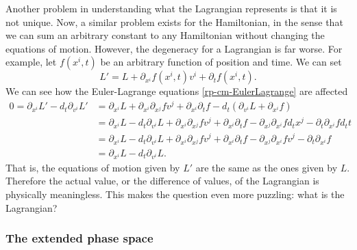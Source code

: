 Another problem in understanding what the Lagrangian represents is that it is not unique. Now, a similar problem exists for the Hamiltonian, in the sense that we can sum an arbitrary constant to any Hamiltonian without changing the equations of motion. However, the degeneracy for a Lagrangian is far worse. For example, let $f(x^i,t)$ be an arbitrary function of position and time. We can set
\begin{equation}\label{rp-cm-lm-gaugeChange}
	L' = L + \partial_{x^i} f(x^i, t) v^i + \partial_t f(x^i, t).
\end{equation}
We can see how the Euler-Lagrange equations \ref{rp-cm-EulerLagrange} are affected
\begin{equation}
	\begin{aligned}
		0 =\partial_{x^i}L' - d_t \partial_{v^i} L' &= \partial_{x^i} L + \partial_{x^i} \partial_{x^j} f v^j + \partial_{x^i} \partial_t f - d_t \left( \partial_{v^i} L + \partial_{x^i} f \right) \\
		&= \partial_{x^i} L - d_t \partial_{v^i} L + \partial_{x^i} \partial_{x^j} f v^j + \partial_{x^i} \partial_t f - \partial_{x^j}\partial_{x^i} f d_t x^j - \partial_t \partial_{x^i} f d_t t \\
		&= \partial_{x^i} L - d_t \partial_{v^i} L + \partial_{x^i} \partial_{x^j} f v^j + \partial_{x^i} \partial_t f - \partial_{x^j}\partial_{x^i} f v^j - \partial_t \partial_{x^i} f \\
		&= \partial_{x^i} L - d_t \partial_{v^i} L.
	\end{aligned}
\end{equation}
That is, the equations of motion given by $L'$ are the same as the ones given by $L$. Therefore the actual value, or the difference of values, of the Lagrangian is physically meaningless. This makes the question even more puzzling: what is the Lagrangian?

\subsubsection{The extended phase space}


